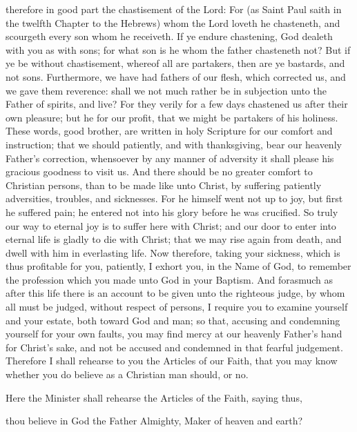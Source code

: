  therefore in good part the chastisement of the Lord:
For (as Saint Paul saith in the twelfth Chapter to the Hebrews) whom the Lord loveth he chasteneth, and scourgeth every son whom he receiveth.
If ye endure chastening, God dealeth with you as with sons; for what son is he whom the father chasteneth not?
But if ye be without chastisement, whereof all are partakers, then are ye bastards, and not sons.
Furthermore, we have had fathers of our flesh, which corrected us, and we gave them reverence: shall we not much rather be in subjection unto the Father of spirits, and live?
For they verily for a few days chastened us after their own pleasure; but he for our profit, that we might be partakers of his holiness.
These words, good brother, are written in holy Scripture for our comfort and instruction; that we should patiently, and with thanksgiving, bear our heavenly Father's correction, whensoever by any manner of adversity it shall please his gracious goodness to visit us.
And there should be no greater comfort to Christian persons, than to be made like unto Christ, by suffering patiently adversities, troubles, and sicknesses.
For he himself went not up to joy, but first he suffered pain; he entered not into his glory before he was crucified.
So truly our way to eternal joy is to suffer here with Christ; and our door to enter into eternal life is gladly to die with Christ; that we may rise again from death, and dwell with him in everlasting life.
Now therefore, taking your sickness, which is thus profitable for you, patiently, I exhort you, in the Name of God, to remember the profession which you made unto God in your Baptism.
And forasmuch as after this life there is an account to be given unto the righteous judge, by whom all must be judged, without respect of persons, I require you to examine yourself and your estate, both toward God and man; so that, accusing and condemning yourself for your own faults, you may find mercy at our heavenly Father's hand for Christ's sake, and not be accused and condemned in that fearful judgement.
Therefore I shall rehearse to you the Articles of our Faith, that you may know whether you do believe as a Christian man should, or no.

\newpage

\begin{rubric}
Here the Minister shall rehearse the Articles of the Faith, saying thus,
\end{rubric}

 thou believe in God the Father Almighty, Maker of heaven and earth?

